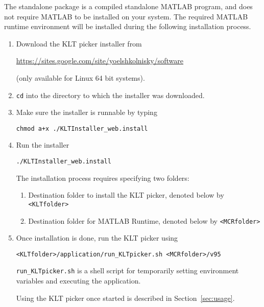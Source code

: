 \documentclass[12pt,a4paper]{article}
\begin{document}
The standalone package is a compiled standalone MATLAB program, and does not require MATLAB to be installed on your system. The required MATLAB runtime environment will be installed during the following installation process.

\begin{enumerate}
\item Download the KLT picker installer from
\begin{center}
\url{https://sites.google.com/site/yoelshkolnisky/software}
\end{center}
(only available for Linux 64 bit systems).

\item \texttt{cd} into the directory to which the installer was downloaded.
\item Make sure the installer is runnable by typing
\begin{center}
\texttt{chmod a+x ./KLTInstaller\_web.install}
\end{center}
\item Run the installer
\begin{center}
	\texttt{./KLTInstaller\_web.install}
\end{center}
The installation process requires specifying two folders:
\begin{enumerate}
\item Destination folder to install the KLT picker, denoted below by \texttt{<KLTfolder>}
\item Destination folder for MATLAB Runtime, denoted below by \texttt{<MCRfolder>}
\end{enumerate}
\item Once installation is done, run the KLT picker using
\begin{center}
\texttt{<KLTfolder>/application/run\_KLTpicker.sh <MCRfolder>/v95}
\end{center}

\texttt{run\_KLTpicker.sh} is a shell script for temporarily setting environment variables and executing the application.

Using the KLT picker once started is described in Section~\ref{sec:usage}.


\end{enumerate}
\end{document}
